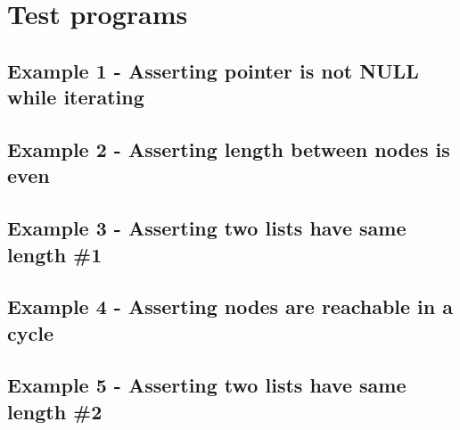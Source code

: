\newpage
\clearpage
\section*{Test programs}
\subsection*{Example 1 - Asserting pointer is not NULL while iterating}
\newpage
\clearpage
\subsection*{Example 2 - Asserting length between nodes is even}
\newpage
\clearpage
\subsection*{Example 3 - Asserting two lists have same length \#1}
\newpage
\clearpage
\subsection*{Example 4 - Asserting nodes are reachable in a cycle}
\newpage
\clearpage
\subsection*{Example 5 - Asserting two lists have same length \#2}

